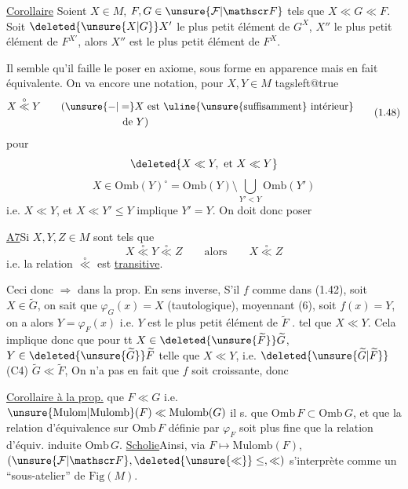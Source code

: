\uline{Corollaire} Soient $X\in M$, $F,G\in\unsure{\mathcal F|\mathscr F}$ tels que $X\ll G\ll F$.
Soit $\deleted{\unsure{X|G}}X'$ le plus petit élément de $G^X$, $X''$ le plus petit élément de $F^{X'}$, alors $X''$ est  le plus petit élément de $F^X$.

Il semble qu'il faille le poser en axiome, sous forme en apparence \unsure{;|,} mais en fait équivalente. On va   encore une notation, pour $X,Y\in M$
\begingroup\csname tagsleft@true\endcsname
\[
\begin{aligned}
 X\overset{\circ}{\ll}Y\qquad &(\unsure{-|=}X\text{ est \uline{\unsure{suffisamment} intérieur}}\\
 &\hspace{6em}\text{de }Y)
\end{aligned}
\tag*{(1.48)}
\]
\endgroup
pour
\[
 \deleted{X\ll Y,\ \text{et}\ X\ll Y}
\]
\[
 X\in\mathrm{Omb}(Y)^{\circ}=\mathrm{Omb}(Y)\setminus\bigcup_{Y'<Y}\mathrm{Omb}(Y')
\]
i.e. $X\ll Y$, et $X\ll Y'\leq Y$ implique $Y'=Y$.
On doit donc poser

\uline{A7}\quad Si $X,Y,Z\in M$ sont tels que
\[
 X\overset{\circ}{\ll}Y\overset{\circ}{\ll}Z\qquad\text{alors}\qquad X\overset{\circ}{\ll}Z
\]
i.e. la relation $\overset{\circ}{\ll}$ est \uline{transitive}.

Ceci  donc $\Rightarrow$ dans la prop.
En sens inverse, S'il  $f$ comme dans (1.42), soit $X\in\widetilde G$,   on sait que $\varphi_G(x)=X$ (tautologique), moyennant (6),  soit $f(x)=Y$, on a alors $Y=\varphi_F(x)$ i.e. $Y$ est le plus petit élément de $\widetilde F$ .  tel que $X\ll Y$. Cela  implique donc que pour tt $X\in\deleted{\unsure{\widetilde F}}\widetilde G$,  $Y\in\deleted{\unsure{\widetilde G}}\widetilde F$ telle que $X\ll Y$, i.e. $\deleted{\unsure{\widetilde G|\widetilde F}}$ (C4) $\widetilde G\ll\widetilde F$,  On n'a pas  en fait que $f$ soit croissante, donc

\uline{Corollaire à la prop.}\quad {}  que $F\ll G$ i.e. $\unsure{\mathrm{Mulom}|\mathrm{Mulomb}}(F)\ll\mathrm{Mulomb}(G)$ il s. que $\mathrm{Omb}\,F\subset\mathrm{Omb}\,G$,
et que  la relation d'équivalence  sur $\mathrm{Omb}\,F$ définie par $\varphi_F$ soit plus fine que la relation d'équiv. induite  $\mathrm{Omb}\,G$.
\uline{Scholie}\quad Ainsi, via $F\longmapsto\mathrm{Mulomb}(F)$,
$(\unsure{\mathcal F|\mathscr F},\deleted{\unsure{\ll}}\leq,\ll)$ s'interprète comme un ``sous-atelier'' de $\mathrm{Fig}(M)$.

